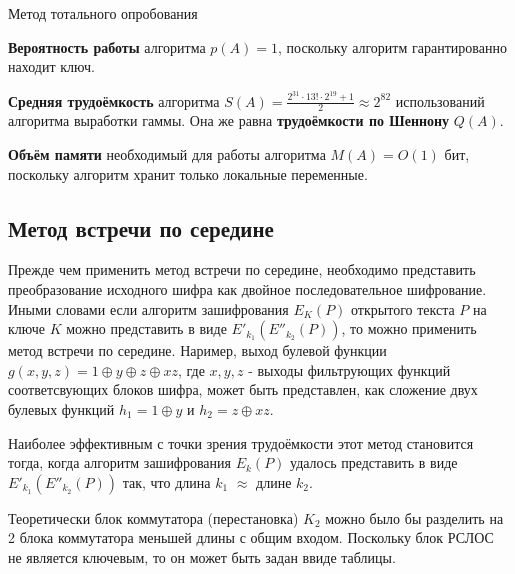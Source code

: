 \documentclass[a4paper,12pt]{article}
\theoremstyle{definition}
\begin{document}
	\begin{algorithm}[H]
		
		\caption{Метод тотального опробования}
		\label{alg:Total}
		\SetAlgoNoEnd
		
		
	\end{algorithm}	
	
	
	\textbf{Вероятность работы} алгоритма $p(A)=1$, поскольку алгоритм гарантированно находит ключ. 
	
	\textbf{Средняя трудоёмкость} алгоритма $S(A)=\frac{2^{31} \cdot 13! \cdot 2^{19} + 1}{2} \approx 2^{82} $ использований алгоритма выработки гаммы. Она же равна \textbf{трудоёмкости по Шеннону} $Q(A)$.
	
	\textbf{Объём памяти} необходимый для работы алгоритма $M(A) = O(1)$ бит, поскольку алгоритм хранит только локальные переменные.
	
	\subsection{Метод встречи по середине}
	
	Прежде чем применить метод встречи по середине, необходимо представить преобразование исходного шифра как двойное последовательное шифрование. Иными словами если алгоритм зашифрования $E_K(P)$ открытого текста $P$ на ключе $K$ можно представить в виде $E'_{k_1}(E''_{k_2}(P))$, то можно применить метод встречи по середине. Наример, выход булевой функции $g(x,y,z) = 1 \oplus y \oplus z \oplus x z$, где $x, y, z$ - выходы фильтрующих функций соответсвующих блоков шифра, может быть представлен, как сложение двух булевых функций $ h_1=1 \oplus y $ и $ h_2=z \oplus x z $. 
	
	Наиболее эффективным с точки зрения трудоёмкости этот метод становится тогда, когда алгоритм зашифрования $E_k(P)$ удалось представить в виде $E'_{k_1}(E''_{k_2}(P))$ так, что длина $k_1$ $\approx$ длине $k_2$.
	
	Теоретически блок коммутатора (перестановка) $K_2$ можно было бы разделить на 2 блока коммутатора меньшей длины с общим входом. Поскольку блок РСЛОС не является ключевым, то он может быть задан ввиде таблицы.
	
\end{document}

